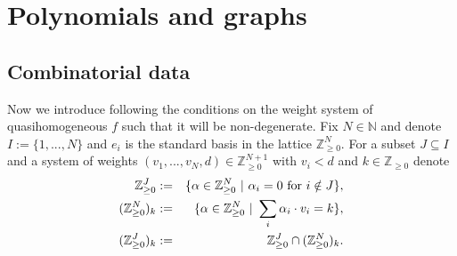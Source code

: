 \documentclass[reqno,12pt]{amsart}
\numberwithin{equation}{section}
\theoremstyle{plain}
\theoremstyle{definition}
\newcommand{\ZZ}{{\mathbb{Z}}}
\newcommand{\NN}{{\mathbb{N}}}
\begin{document}
\section{Polynomials and graphs}
\subsection{Combinatorial data}
Now we introduce following \cite{HK} the conditions on the weight system of quasihomogeneous $f$ such that it will be non-degenerate. Fix $N\in\NN$ and denote $I:=\{1,...,N\}$ and $e_i$ is the standard basis in the lattice $\ZZ_{\geq 0}^N$. For a subset $J\subseteq I$ and a system of weights $(v_1,...,v_N,d)\in\ZZ_{\geq 0}^{N+1}$ with $v_i<d$ and
$k\in\ZZ_{\geq 0}$ denote
\begin{eqnarray*}
\ZZ_{\geq 0}^J&:=& \{\alpha\in\ZZ_{\geq 0}^N\ |\ \alpha_i=0\textup{ for }i\notin J\},\\
(\ZZ^N_{\geq 0})_k&:=& \{\alpha\in \ZZ_{\geq 0}^N\ |\ \sum_i\alpha_i\cdot v_i=k\},\\
(\ZZ_{\geq 0}^J)_k&:=& \ZZ_{\geq 0}^J\cap (\ZZ_{\geq 0}^N)_k.
\end{eqnarray*}
\end{document}
